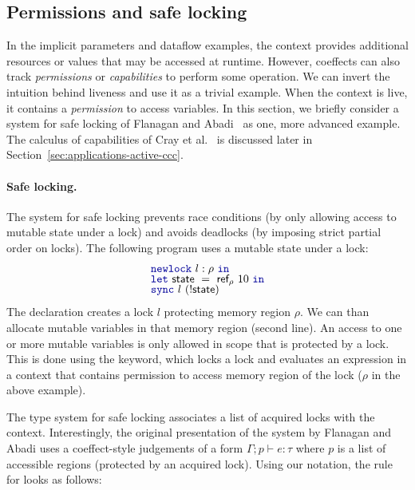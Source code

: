 \subsection{Permissions and safe locking}
In the implicit parameters and dataflow examples, the context provides additional resources or
values that may be accessed at runtime. However, coeffects can also track \emph{permissions} or
\emph{capabilities} to perform some operation. We can invert the intuition behind liveness and
use it as a trivial example. When the context is live, it contains a \emph{permission} to access
variables. In this section, we briefly consider a system for safe locking of Flanagan and
Abadi~\cite{app-safe-locking} as one, more advanced example. The calculus of capabilities of
Cray et al.~\cite{app-capabilities} is discussed later in Section~\ref{sec:applications-active-ccc}.

\paragraph{Safe locking.}
The system for safe locking prevents race conditions (by only allowing access to mutable state
under a lock) and avoids deadlocks (by imposing strict partial order on locks). The following
program uses a mutable state under a lock:
%
\begin{equation*}
\begin{array}{l}
\kvd{newlock}~l:\rho~\kvd{in}\\[-0.25em]
\kvd{let}~\ident{state}~=~\ident{ref}_\rho~10~\kvd{in}\\[-0.25em]
\kvd{sync}~l~(!\ident{state})
\end{array}
\end{equation*}
%
The declaration  creates a lock $l$ protecting memory region $\rho$. We can than
allocate mutable variables in that memory region (second line). An access to one or more mutable
variables is only allowed in scope that is protected by a lock. This is done using the  keyword,
which locks a lock and evaluates an expression in a context that contains permission to access
memory region of the lock ($\rho$ in the above example).

The type system for safe locking associates a list of acquired locks with the context.
Interestingly, the original presentation of the system by Flanagan and Abadi \cite{app-safe-locking}
uses a coeffect-style judgements of a form $\Gamma; p \vdash e : \tau$ where $p$ is a list of
accessible regions (protected by an acquired lock). Using our notation, the rule for 
looks as follows:

